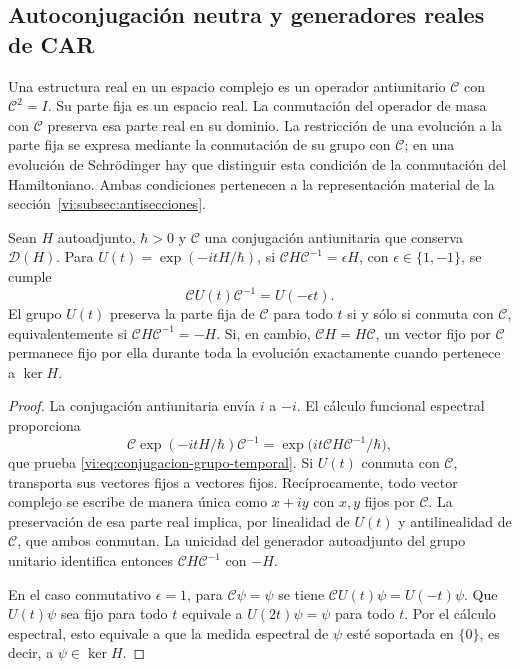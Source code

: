 \subsection{Autoconjugación neutra y generadores reales de CAR}
\label{vi:subsec:majorana-categorias}

Una estructura real en un espacio complejo es un operador antiunitario
$\mathcal C$ con $\mathcal C^2=I$. Su parte fija es un espacio real.
La conmutación del operador de masa con $\mathcal C$ preserva esa
parte real en su dominio. La restricción de una evolución a la parte
fija se expresa mediante la conmutación de su grupo con $\mathcal C$;
en una evolución de Schr\"odinger hay que distinguir esta condición
de la conmutación del Hamiltoniano. Ambas condiciones pertenecen a la
representación material de la sección~\ref{vi:subsec:antisecciones}.

\begin{proposition}
\label{vi:prop:conjugacion-evolucion}
Sean $H$ autoadjunto, $\hbar>0$ y $\mathcal C$ una conjugación
antiunitaria que conserva $\mathcal D(H)$. Para
$U(t)=\exp(-itH/\hbar)$, si
$\mathcal C H\mathcal C^{-1}=\epsilon H$, con
$\epsilon\in\{1,-1\}$, se cumple
\begin{equation}
 \mathcal C U(t)\mathcal C^{-1}=U(-\epsilon t).
 \label{vi:eq:conjugacion-grupo-temporal}
\end{equation}
El grupo $U(t)$ preserva la parte fija de $\mathcal C$ para todo $t$
si y sólo si conmuta con $\mathcal C$, equivalentemente si
$\mathcal C H\mathcal C^{-1}=-H$.
Si, en cambio, $\mathcal C H=H\mathcal C$, un vector fijo por
$\mathcal C$ permanece fijo por ella durante toda la evolución
exactamente cuando pertenece a $\ker H$.
\end{proposition}
\begin{proof}
La conjugación antiunitaria envía $i$ a $-i$. El cálculo funcional
espectral proporciona
\[
 \mathcal C\exp(-itH/\hbar)\mathcal C^{-1}
 =\exp\bigl(it\mathcal C H\mathcal C^{-1}/\hbar\bigr),
\]
que prueba \eqref{vi:eq:conjugacion-grupo-temporal}. Si $U(t)$ conmuta
con $\mathcal C$, transporta sus vectores fijos a vectores fijos.
Recíprocamente, todo vector complejo se escribe de manera única como
$x+iy$ con $x,y$ fijos por $\mathcal C$. La preservación de esa parte
real implica, por linealidad de $U(t)$ y antilinealidad de
$\mathcal C$, que ambos conmutan. La unicidad del generador
autoadjunto del grupo unitario identifica entonces
$\mathcal C H\mathcal C^{-1}$ con $-H$.

En el caso conmutativo $\epsilon=1$, para $\mathcal C\psi=\psi$
se tiene $\mathcal C U(t)\psi=U(-t)\psi$. Que $U(t)\psi$ sea fijo
para todo $t$ equivale a $U(2t)\psi=\psi$ para todo $t$. Por el
cálculo espectral, esto equivale a que la medida espectral de $\psi$
esté soportada en $\{0\}$, es decir, a $\psi\in\ker H$.
\end{proof}

